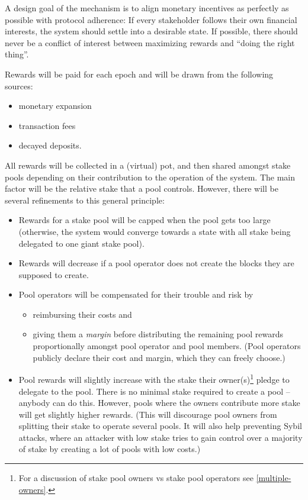 \documentclass[11pt,a4paper,dvipsnames,twosided]{article}
\begin{document}
A design goal of the mechanism is to align monetary incentives as
perfectly as possible with protocol adherence: If every stakeholder
follows their own financial interests, the system should settle into a
desirable state. If possible, there should never be a conflict of
interest between maximizing rewards and ``doing the right thing''.

Rewards will be paid for each epoch and will be drawn from the following
sources:

\begin{itemize}
\item
  monetary expansion
\item
  transaction fees
\item
  decayed deposits.
\end{itemize}

All rewards will be collected in a (virtual) pot, and then shared amongst stake
pools depending on their contribution to the operation of the system. The main
factor will be the relative stake that a pool controls. However, there will be
several refinements to this general principle:

\begin{itemize}
\item
  Rewards for a stake pool will be capped when the pool gets too large
  (otherwise, the system would converge towards a state with all stake
  being delegated to one giant stake pool).
\item
  Rewards will decrease if a pool operator does not create the blocks they
  are supposed to create.
\item
  Pool operators will be compensated for their trouble and risk by
  \begin{itemize}
  \item
    reimbursing their costs and
  \item
    giving them a \emph{margin} before distributing the remaining pool rewards
    proportionally amongst pool operator and pool members. (Pool operators
    publicly declare their cost and margin, which they can freely choose.)
  \end{itemize}
\item
  Pool rewards will slightly increase with the stake their owner(s)\footnote{For
    a discussion of stake pool owners vs stake pool operators see
    \cref{multiple-owners}.} pledge to delegate to the pool. There is no minimal
  stake required to create a pool -- anybody can do this. However, pools where
  the owners contribute more stake will get slightly higher rewards. (This will
  discourage pool owners from splitting their stake to operate several pools. It
  will also help preventing Sybil attacks, where an attacker with low stake
  tries to gain control over a majority of stake by creating a lot of pools with
  low costs.)
\end{itemize}
\end{document}

